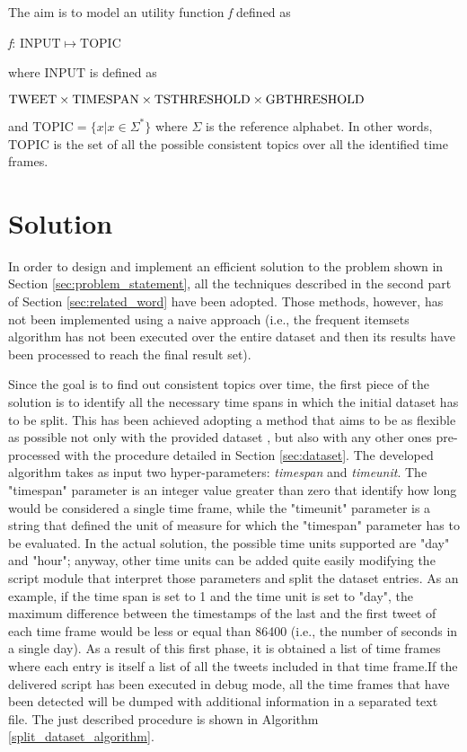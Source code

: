 \noindent The aim is to model an utility function \textit{f} defined as
\begin{center}
	\textit{f}: $\mathrm{INPUT} \mapsto \mathrm{TOPIC}$
\end{center}
where $\mathrm{INPUT}$ is defined as 
\begin{center}
	$\mathrm{TWEET} \times \mathrm{TIMESPAN} \times \mathrm{TS\-THRESHOLD} \times \mathrm{GB\-THRESHOLD}$
\end{center}
 and $\mathrm{TOPIC} = \{x | x \in \Sigma^*\}$ where $\Sigma$ is the reference alphabet. In other words, $\mathrm{TOPIC}$ is the set of all the possible consistent topics over all the identified time frames.

\section{Solution}
\label{sec:solution}
In order to design and implement an efficient solution to the problem shown in Section \ref{sec:problem_statement}, all the techniques described in the second part of Section \ref{sec:related_word} have been adopted. Those methods, however, has not been implemented using a naive approach (i.e., the frequent itemsets algorithm has not been executed over the entire dataset and then its results have been processed to reach the final result set). 

Since the goal is to find out consistent topics over time, the first piece of the solution is to identify all the necessary time spans in which the initial dataset has to be split. This has been achieved adopting a method that aims to be as flexible as possible not only with the provided dataset \cite{covid19-tweets-dataset}, but also with any other ones pre-processed with the procedure detailed in Section \ref{sec:dataset}. The developed algorithm takes as input two hyper-parameters: \textit{timespan} and \textit{timeunit}. The "timespan" parameter is an integer value greater than zero that identify how long would be considered a single time frame, while the "timeunit" parameter is a string that defined the unit of measure for which the "timespan" parameter has to be evaluated. In the actual solution, the possible time units supported are "day" and "hour"; anyway, other time units can be added quite easily modifying the script module that interpret those parameters and split the dataset entries. As an example, if the time span is set to 1 and the time unit is set to "day", the maximum difference between the timestamps of the last and the first tweet of each time frame would be less or equal than 86400 (i.e., the number of seconds in a single day). As a result of this first phase, it is obtained a list of time frames where each entry is itself a list of all the tweets included in that time frame.If the delivered script has been executed in debug mode, all the time frames that have been detected will be dumped with additional information in a separated text file. The just described procedure is shown in Algorithm \ref{split_dataset_algorithm}.

